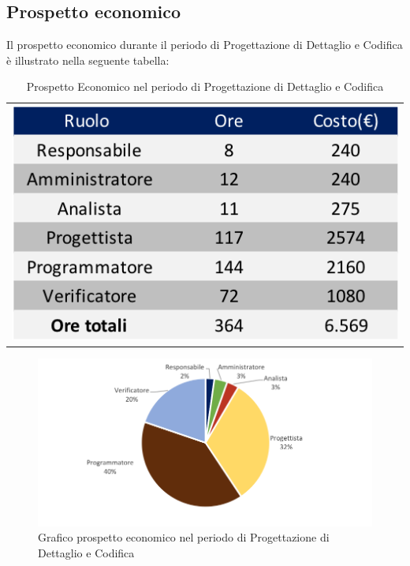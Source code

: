 \subsection{Prospetto economico}
Il prospetto economico durante il periodo di Progettazione di Dettaglio e Codifica è illustrato nella seguente tabella:

\begin{table}[!ht]
	\begin{center}
		\begin{tabular}{c}
			\includegraphics{images/tabellaProgettazioneDettaglioCodificaEuro.png}
		\end{tabular}
		\caption{Prospetto Economico nel periodo di Progettazione di Dettaglio e Codifica}
	\end{center}
\end{table}

\begin{figure}[!ht]
	\begin{center}
		\includegraphics{images/grafoProgettazioneDettaglioCodificaEuro.png}
		\caption{Grafico prospetto economico nel periodo di Progettazione di Dettaglio e Codifica}
	\end{center}
\end{figure}

